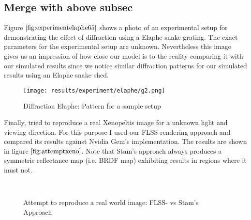 \subsection{Merge with above subsec}
Figure $\ref{fig:experimentelaphe65}$ shows a photo of an experimental setup for demonstrating the effect of diffraction using a Elaphe snake grating. The exact parameters for the experimental setup are unknown. Nevertheless this image gives us an impression of how close our model is to the reality comparing it with our simulated results since we notice similar diffraction patterns for our simulated results using an Elaphe snake shed. 

\begin{figure}[H]
  \texttt{[image: results/experiment/elaphe/g2.png]}
  \caption{Diffraction Elaphe: Pattern for a sample setup}
  \label{fig:experimentelaphe65}
\end{figure}

Finally, tried to reproduce a real Xenopeltis image for a unknown light and viewing direction. For this purpose I used our FLSS rendering approach and compared its results against Nvidia Gem's implementation. The results are shown in figure $\ref{fig:attemptxeno}$. Note that Stam's approach always produces a symmetric reflectance map (i.e. BRDF map) exhibiting results in regions where it must not. 

\begin{figure}[H]
  \centering

~  
  
\caption[Snake Renderings: Stam's- vs. Flss- Approach on Xenopeltis]{Attempt to reproduce a real world image: FLSS- vs Stam's Approach}
\label{fig:attemptxeno}
\end{figure}

